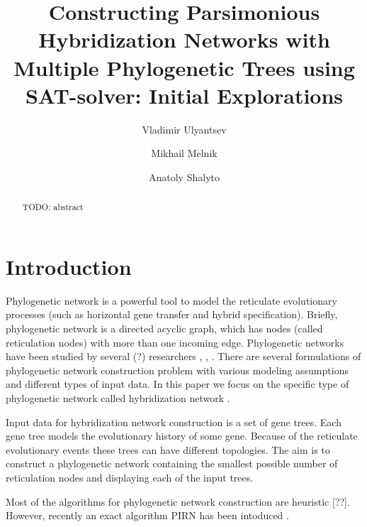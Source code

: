 \documentclass[runningheads, envcountsame, a4paper]{llncs}
\begin{document}
\mainmatter           
\title{Constructing Parsimonious Hybridization Networks with Multiple Phylogenetic Trees using SAT-solver: Initial Explorations}
\titlerunning{ } 
\toctitle{ }

\author{Vladimir Ulyantsev \and Mikhail Melnik \and Anatoly Shalyto}
%

\maketitle
\setcounter{footnote}{0}

\begin{abstract}
  TODO: abstract

\end{abstract}

\section{Introduction}

Phylogenetic network is a powerful tool to model the reticulate
evolutionary processes (such as horizontal gene transfer and hybrid specification).
Briefly, phylogenetic network is a directed acyclic graph, which has
nodes (called reticulation nodes) with more than one incoming edge. Phylogenetic
networks have been studied by several (?) researchers \cite{huson}, \cite{morrison}, 
\cite{nakhleh}. There are several formulations of phylogenetic network
construction problem with various modeling assumptions and different types of input data. 
In this paper we focus on the specific type of phylogenetic network called hybridization
network \cite{semple}.

Input data for hybridization network construction is a set of gene trees. %
Each gene tree models the evolutionary history of some gene. %
Because of the reticulate evolutionary events these trees can have different topologies.
The aim is to construct a phylogenetic network
containing the smallest possible number of reticulation nodes and displaying each of the input trees. 

Most of the algorithms for phylogenetic network construction are heuristic [??].
However, recently an exact algorithm PIRN has been intoduced \cite{wu}.
\end{document}
